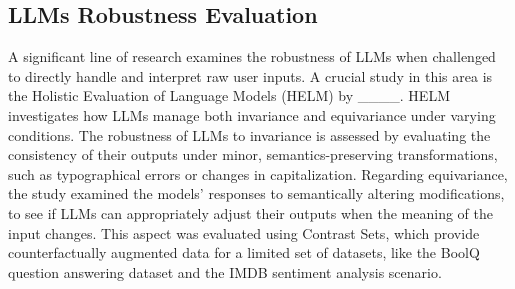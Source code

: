 
\subsection{LLMs Robustness Evaluation}

A significant line of research examines the robustness of LLMs when challenged to directly handle and interpret raw user inputs. A crucial study in this area is the Holistic Evaluation of Language Models (HELM) by ____. HELM investigates how LLMs manage both invariance and equivariance under varying conditions.
The robustness of LLMs to invariance is assessed by evaluating the consistency of their outputs under minor, semantics-preserving transformations, such as typographical errors or changes in capitalization. Regarding equivariance, the study examined the models' responses to semantically altering modifications, to see if LLMs can appropriately adjust their outputs when the meaning of the input changes. This aspect was evaluated using Contrast Sets, which provide counterfactually augmented data for a limited set of datasets, like the BoolQ question answering dataset and the IMDB sentiment analysis scenario. 

